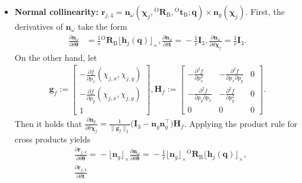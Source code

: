 \documentclass[journal,twoside,web]{ieeecolor}
\begin{document}
\begin{itemize}
\item \textbf{Normal collinearity:}
$
\mathbf{r}_{j,4}
\!\!=\!\!
\mathbf{n}_\omega(\bm{\chi}_j,{}^{\mathrm{O}}\mathbf{R}_\mathrm{B},{}^{\mathrm{O}}\mathbf{t}_{\mathrm{B}};\mathbf{q})
\!\!\times\!\!
\mathbf{n}_g(\bm{\chi}_j).
$
First, the derivatives of \(\mathbf{n}_\omega\) take the form
\begin{align}\label{eq:manidolf_grad_detail4}
\frac{\partial \mathbf{n}_\omega}{\partial \delta\boldsymbol{\theta}}
&\!=\!
\frac{1}{r}{}^{\mathrm{O}}\mathbf{R}_\mathrm{B}\lfloor\mathbf{h}_j(\mathbf{q})\rfloor_{\times},
\frac{\partial \mathbf{n}_\omega}{\partial \delta\mathbf{t}}
\!=\!
-\frac{1}{r}\mathbf{I}_3,
\frac{\partial \mathbf{n}_\omega}{\partial \delta\bm{\chi}_j}
\!=\!
\frac{1}{r}\mathbf{I}_3.
\end{align}
On the other hand, let
\begin{equation}
\begin{aligned}
\mathbf{g}_f\!\!:=\!\!
\begin{bmatrix}
-\frac{\partial f}{\partial p_x}(\chi_{j,x},\chi_{j,y}) \\[4pt]
-\frac{\partial f}{\partial p_y}(\chi_{j,x},\chi_{j,y}) \\[4pt]
1
\end{bmatrix},
\mathbf{H}_f\!\!
:=\!\!
\begin{bmatrix}
-\frac{\partial^2 f}{\partial p_x^2} & -\frac{\partial^2 f}{\partial p_x\partial p_y} & 0\\
-\frac{\partial^2 f}{\partial p_y\partial p_x} & -\frac{\partial^2 f}{\partial p_y^2} & 0\\
0 & 0 & 0
\end{bmatrix}.
\end{aligned}
\end{equation}
Then it holds that
$\frac{\partial \mathbf{n}_g}{\partial \delta\bm{\chi}_j}
=
\frac{1}{\|\mathbf{g}_f\|_2}
\bigl(\mathbf{I}_3-\mathbf{n}_g\mathbf{n}_g^\top\bigr)\mathbf{H}_f$.
Applying the product rule for cross products yields
\begin{equation}
\begin{aligned}\label{eq:manidolf_grad_detail5}
&\frac{\partial \mathbf{r}_{j,4}}{\partial \delta\boldsymbol{\theta}}
\!=\!
-\lfloor\mathbf{n}_g\rfloor_{\times}
\frac{\partial \mathbf{n}_\omega}{\partial \delta\boldsymbol{\theta}}
\!=\!
-\frac{1}{r}
\lfloor\mathbf{n}_g\rfloor_{\times}
{}^{\mathrm{O}}\mathbf{R}_\mathrm{B}
\lfloor\mathbf{h}_j(\mathbf{q})\rfloor_{\times},\\
&\frac{\partial \mathbf{r}_{j,4}}{\partial \delta\mathbf{t}}

\end{aligned}
\end{equation}
\end{itemize}
\end{document}
